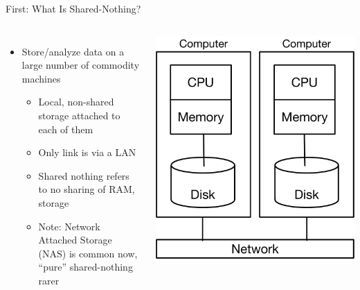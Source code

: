 \documentclass[aspectratio=169]{beamer}
\begin{document}
\begin{frame}{First: What Is Shared-Nothing?}

\begin{columns}[c]
\begin{itemize}
\item Store/analyze data on a large number of commodity machines
        \begin{itemize}
	\item Local, non-shared storage attached to each of them
	\item Only link is via a LAN
        \item Shared nothing refers to no sharing of RAM, storage
	\item Note: Network Attached Storage (NAS) is common now, ``pure'' shared-nothing rarer 
        \end{itemize}
\end{itemize}
    	{\includegraphics[width=1\textwidth]{./lectBigData/sharedNothing.pdf}} \\
\end{columns}
\end{frame}
\end{document}
